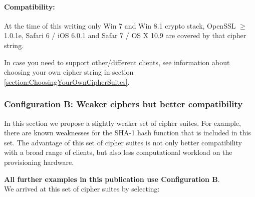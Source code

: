 %




\paragraph*{Compatibility:}

At the time of this writing only Win 7 and Win 8.1 crypto stack,
OpenSSL $\ge$ 1.0.1e, Safari 6 / iOS 6.0.1 and Safar 7 / OS X 10.9
are covered by that cipher string.

In case you need to support other/different clients, see information
about choosing your own cipher string in section
\ref{section:ChoosingYourOwnCipherSuites}.

\subsubsection{Configuration B: Weaker ciphers but better compatibility}

In this section we propose a slightly weaker set of cipher suites.  For
example, there are known weaknesses for the SHA-1 hash function that is
included in this set.  The advantage of this set of cipher suites is not only
better compatibility with a broad range of clients, but also less computational
workload on the provisioning hardware.


\textbf{All further examples in this publication use Configuration B}.\\

We arrived at this set of cipher suites by selecting:

